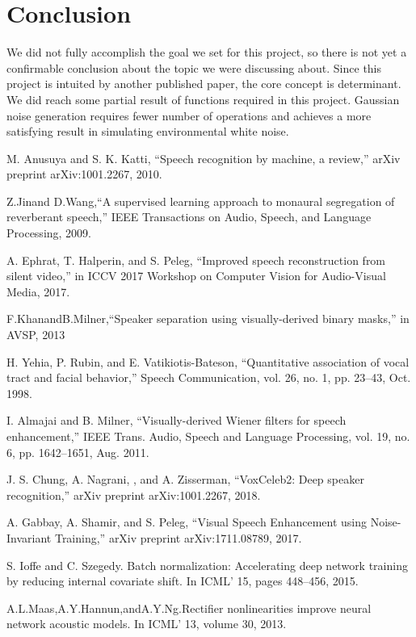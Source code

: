\documentclass[runningheads,a4paper]{llncs}
\begin{document}
\section{Conclusion}
We did not fully accomplish the goal we set for this project, so there is not yet a confirmable conclusion about the topic we were discussing about. Since this project is intuited by another published paper\cite{18}, the core concept is determinant. We did reach some partial result of functions required in this project. Gaussian noise generation requires fewer number of operations and achieves a more satisfying result in simulating environmental white noise.

\begin{thebibliography}{4}

 M. Anusuya and S. K. Katti, “Speech recognition by machine, a review,” arXiv preprint arXiv:1001.2267, 2010.


 Z.Jinand D.Wang,“A supervised learning approach to monaural segregation of reverberant speech,” IEEE Transactions on Audio, Speech, and Language Processing, 2009.


  A. Ephrat, T. Halperin, and S. Peleg, “Improved speech reconstruction from silent video,” in ICCV 2017 Workshop on Computer Vision for Audio-Visual Media, 2017.


 F.KhanandB.Milner,“Speaker separation using visually-derived binary masks,” in AVSP, 2013


  H. Yehia, P. Rubin, and E. Vatikiotis-Bateson, “Quantitative association of vocal tract and facial behavior,” Speech Communication, vol. 26, no. 1, pp. 23–43, Oct. 1998.


 I. Almajai and B. Milner, “Visually-derived Wiener filters for speech enhancement,” IEEE Trans. Audio, Speech and Language Processing, vol. 19, no. 6, pp. 1642–1651, Aug. 2011.


 J. S. Chung, A. Nagrani, , and A. Zisserman, “VoxCeleb2: Deep speaker recognition,” arXiv preprint arXiv:1001.2267, 2018.


 A. Gabbay, A. Shamir, and S. Peleg, “Visual Speech Enhancement using Noise-Invariant Training,” arXiv preprint arXiv:1711.08789, 2017.


 S. Ioffe and C. Szegedy. Batch normalization: Accelerating deep network training by reducing internal covariate shift. In ICML’ 15, pages 448–456, 2015.


 A.L.Maas,A.Y.Hannun,andA.Y.Ng.Rectifier nonlinearities improve neural network acoustic models. In ICML’ 13, volume 30, 2013.



\end{thebibliography}
\end{document}
